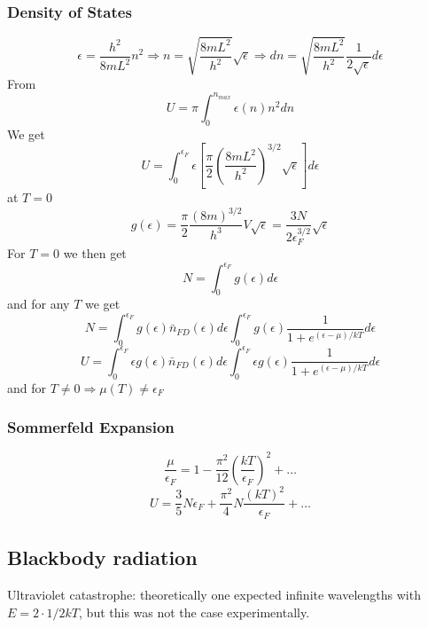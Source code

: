 \documentclass[a4paper,norsk, 10pt]{article}
\begin{document}
\subsubsection{Density of States}
\begin{equation}
\epsilon = \frac{h^2}{8mL^2}n^2 \Rightarrow n = \sqrt{\frac{8mL^2}{h^2}}\sqrt{\epsilon} \Rightarrow dn = \sqrt{\frac{8mL^2}{h^2}} \frac{1}{2\sqrt{\epsilon}}d\epsilon
\end{equation}
From
\begin{equation}
U = \pi \int_0^{n_{max}}\epsilon(n) n^2 dn
\end{equation}
We get
\begin{equation}
U = \int_0^{\epsilon_F}\epsilon\left[\frac{\pi}{2}\left(\frac{8mL^2}{h^2}\right)^{3/2}\sqrt{\epsilon}\right] d\epsilon
\end{equation}
at $T=0$
\begin{equation}
g(\epsilon) = \frac{\pi}{2}\frac{(8m)^{3/2}}{h^3}V\sqrt{\epsilon} = \frac{3N}{2\epsilon_F^{3/2}}\sqrt{\epsilon}
\end{equation}
For $T=0$ we then get
\begin{equation}
N = \int_0^{\epsilon_F}g(\epsilon) d\epsilon
\end{equation}
and for any $T$ we get
\begin{equation}
N = \int_0^{\epsilon_F}g(\epsilon) \bar{n}_{FD}(\epsilon) d\epsilon \int_0^{\epsilon_F}g(\epsilon)\frac{1}{1 + e^{(\epsilon - \mu)/kT}} d\epsilon
\end{equation}
\begin{equation}
U = \int_0^{\epsilon_F}\epsilon g(\epsilon) \bar{n}_{FD}(\epsilon) d\epsilon \int_0^{\epsilon_F}\epsilon g(\epsilon)\frac{1}{1 + e^{(\epsilon - \mu)/kT}} d\epsilon
\end{equation}
and for $T\neq 0 \Rightarrow \mu(T) \neq \epsilon_F$
\subsubsection{Sommerfeld Expansion}
\begin{equation}
\frac{\mu }{\epsilon_F} = 1 - \frac{\pi^2}{12}\left(\frac{kT}{\epsilon_F}\right)^2 + \ldots
\end{equation}
\begin{equation}
U = \frac{3}{5}N\epsilon_F + \frac{\pi^2}{4}N\frac{(kT)^2}{\epsilon_F} + \ldots
\end{equation}
\subsection{Blackbody radiation}
Ultraviolet catastrophe: theoretically one expected infinite wavelengths with $E = 2\cdot 1/2 kT$, but this was not the case experimentally.
\end{document}
